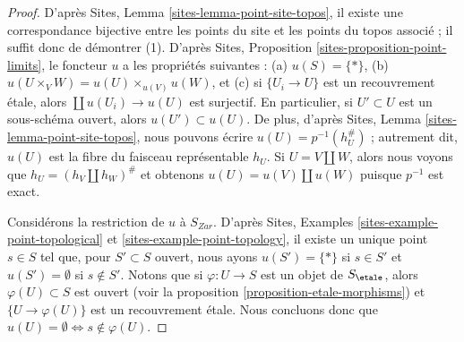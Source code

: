\begin{proof}
D'apr\`es
Sites, Lemma \ref{sites-lemma-point-site-topos},
il existe une correspondance bijective entre les points du site et les points
du topos associ\'e ; il suffit donc de d\'emontrer (1).
D'apr\`es
Sites, Proposition \ref{sites-proposition-point-limits},
le foncteur $u$ a les propri\'et\'es suivantes :
(a) $u(S) = \{*\}$, (b) $u(U \times_V W) = u(U) \times_{u(V)} u(W)$, et
(c) si $\{U_i \to U\}$ est un recouvrement \'etale, alors
$\coprod u(U_i) \to u(U)$ est surjectif.
En particulier, si $U' \subset U$ est un sous-sch\'ema ouvert,
alors $u(U') \subset u(U)$. De plus, d'apr\`es
Sites, Lemma \ref{sites-lemma-point-site-topos},
nous pouvons \'ecrire $u(U) = p^{-1}(h_U^\#)$ ; autrement dit, $u(U)$ est la
fibre du faisceau repr\'esentable $h_U$. Si
$U = V \amalg W$, alors nous voyons que $h_U = (h_V \amalg h_W)^\#$ et obtenons
$u(U) = u(V) \amalg u(W)$ puisque $p^{-1}$ est exact.

\medskip\noindent
Consid\'erons la restriction de $u$ \`a $S_{Zar}$. D'apr\`es
Sites, Examples \ref{sites-example-point-topological} et
\ref{sites-example-point-topology},
il existe un unique point $s \in S$ tel que, pour $S' \subset S$ ouvert, nous
ayons $u(S') = \{*\}$ si $s \in S'$ et $u(S') = \emptyset$ si $s \not \in S'$.
Notons que si $\varphi : U \to S$ est un objet de $S_\etale$, alors
$\varphi(U) \subset S$ est ouvert (voir la
proposition \ref{proposition-etale-morphisms})
et $\{U \to \varphi(U)\}$ est un recouvrement \'etale. Nous concluons donc que
$u(U) = \emptyset \Leftrightarrow s \not \in \varphi(U)$.


\end{proof}
